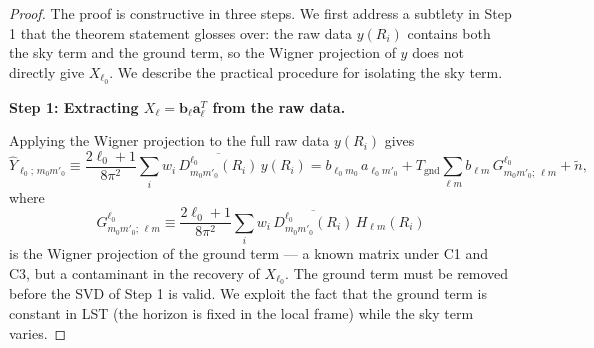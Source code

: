 \documentclass{aastex631}
\newcommand{\Hlm}{H_{\ell m}}
\newcommand{\Tgnd}{T_\mathrm{gnd}}
\theoremstyle{plain}
\theoremstyle{remark}
\begin{document}
\begin{proof}
The proof is constructive in three steps.
We first address a subtlety in Step 1 that the theorem statement
glosses over: the raw data $y(R_i)$ contains both the sky term and
the ground term, so the Wigner projection of $y$ does not directly
give $X_{\ell_0}$.
We describe the practical procedure for isolating the sky term.

\textbf{Step 1: Extracting $X_\ell = \mathbf{b}_\ell
\mathbf{a}_\ell^T$ from the raw data.}

Applying the Wigner projection to the full raw data $y(R_i)$ gives
\begin{equation} \label{eq:proj_raw}
  \hat{Y}_{\ell_0;\,m_0 m'_0}
  \equiv \frac{2\ell_0+1}{8\pi^2}
  \sum_i w_i\, \overline{D^{\ell_0}_{m_0 m'_0}(R_i)}\, y(R_i)
  = b_{\ell_0 m_0}\, a_{\ell_0 m'_0}
  + \Tgnd \sum_{\ell m} b_{\ell m}\, G^{\ell_0}_{m_0 m'_0;\,\ell m}
  + \tilde{n},
\end{equation}
where
\begin{equation}
  G^{\ell_0}_{m_0 m'_0;\,\ell m}
  \equiv \frac{2\ell_0+1}{8\pi^2}
  \sum_i w_i\,\overline{D^{\ell_0}_{m_0 m'_0}(R_i)}\,\Hlm(R_i)
\end{equation}
is the Wigner projection of the ground term --- a known matrix under
C1 and C3, but a contaminant in the recovery of $X_{\ell_0}$.
The ground term must be removed before the SVD of Step 1 is valid.
We exploit the fact that the ground term is constant in LST
(the horizon is fixed in the local frame) while the sky term varies.


\end{proof}
\end{document}
